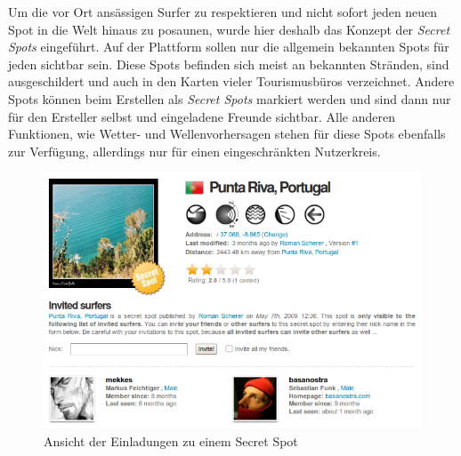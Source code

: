 Um die vor Ort ansässigen Surfer zu respektieren und nicht sofort
jeden neuen Spot in die Welt hinaus zu posaunen, wurde hier deshalb
das Konzept der \textit{Secret Spots} eingeführt. Auf der Plattform
sollen nur die allgemein bekannten Spots für jeden sichtbar
sein. Diese Spots befinden sich meist an bekannten Stränden, sind
ausgeschildert und auch in den Karten vieler Tourismusbüros
verzeichnet. Andere Spots können beim Erstellen als \textit{Secret
  Spots} markiert werden und sind dann nur für den Ersteller selbst
und eingeladene Freunde sichtbar. Alle anderen Funktionen, wie Wetter-
und Wellenvorhersagen stehen für diese Spots ebenfalls zur Verfügung,
allerdings nur für einen eingeschränkten Nutzerkreis.

\begin{figure}[t]
 \includegraphics[width=\textwidth]{bilder/secret-spot}
 \caption{Ansicht der Einladungen zu einem Secret Spot}
 \label{secret-spot}
\end{figure}

